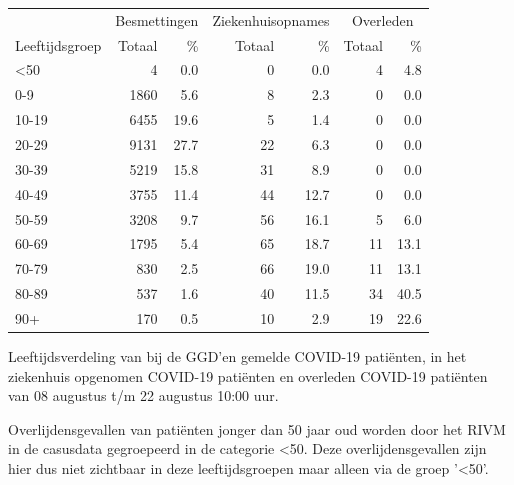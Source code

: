\documentclass[
  english,
  man,floatsintext]{apa6}
\begin{document}
\begin{table}
\centering\begingroup\fontsize{11}{13}\selectfont

\begin{threeparttable}
\begin{tabular}{lrrrrrr}
\toprule
\multicolumn{1}{c}{ } & \multicolumn{2}{c}{Besmettingen} & \multicolumn{2}{c}{Ziekenhuisopnames} & \multicolumn{2}{c}{Overleden} \\
\cmidrule(l{3pt}r{3pt}){2-3} \cmidrule(l{3pt}r{3pt}){4-5} \cmidrule(l{3pt}r{3pt}){6-7}
Leeftijdsgroep & Totaal & \% & Totaal & \% & Totaal & \%\\
\midrule
<50 & 4 & 0.0 & 0 & 0.0 & 4 & 4.8\\
0-9 & 1860 & 5.6 & 8 & 2.3 & 0 & 0.0\\
10-19 & 6455 & 19.6 & 5 & 1.4 & 0 & 0.0\\
20-29 & 9131 & 27.7 & 22 & 6.3 & 0 & 0.0\\
30-39 & 5219 & 15.8 & 31 & 8.9 & 0 & 0.0\\
40-49 & 3755 & 11.4 & 44 & 12.7 & 0 & 0.0\\
50-59 & 3208 & 9.7 & 56 & 16.1 & 5 & 6.0\\
60-69 & 1795 & 5.4 & 65 & 18.7 & 11 & 13.1\\
70-79 & 830 & 2.5 & 66 & 19.0 & 11 & 13.1\\
80-89 & 537 & 1.6 & 40 & 11.5 & 34 & 40.5\\
90+ & 170 & 0.5 & 10 & 2.9 & 19 & 22.6\\
\bottomrule
\end{tabular}
\begin{tablenotes}
\item[1] Leeftijdsverdeling van bij de GGD’en gemelde COVID-19 patiënten, in het ziekenhuis opgenomen COVID-19 patiënten en overleden COVID-19 patiënten van 08 augustus t/m 22 augustus 10:00 uur.
\item[2] Overlijdensgevallen van patiënten jonger dan 50 jaar oud worden door het RIVM in de casusdata gegroepeerd in de categorie <50. Deze overlijdensgevallen zijn hier dus niet zichtbaar in deze leeftijdsgroepen maar alleen via de groep '<50'.
\end{tablenotes}
\end{threeparttable}
\endgroup{}
\end{table}

\newpage
\end{document}
